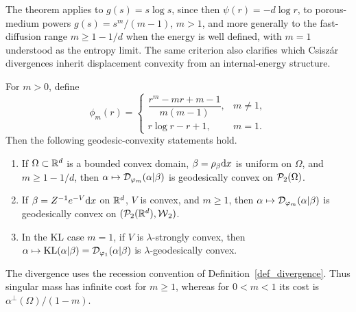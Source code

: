 The theorem applies to \(g(s)=s\log s\), since then \(\psi(r)=-d\log r\), to porous-medium powers \(g(s)=s^m/(m-1)\), \(m>1\), and more generally to the fast-diffusion range \(m\geq1-1/d\) when the energy is well defined, with \(m=1\) understood as the entropy limit.
The same criterion also clarifies which Csisz\'ar divergences inherit displacement convexity from an internal-energy structure.
\begin{prop}\label{prop-power-divergences-geodesic-convexity}\label{prop-kl-gibbs-geodesic-convexity}
	For \(m>0\), define
	\[
		\phi_m(r)=
		\begin{cases}
			\dfrac{r^m-mr+m-1}{m(m-1)}, & m\neq1,\\[2mm]
			r\log r-r+1, & m=1.
		\end{cases}
	\]
	Then the following geodesic-convexity statements hold.
	\begin{enumerate}
	\item If \(\Omega\subset\mathbb{R}^d\) is a bounded convex domain, \(\beta=\rho_{\beta}\mathrm{d} x\) is uniform on \(\Omega\), and \(m\geq1-1/d\), then \(\alpha\mapsto\mathcal{D}_{\varphi_m}(\alpha|\beta)\) is geodesically convex on \(\mathcal{P}_2(\Omega)\).
		\item If \(\beta=Z^{-1}e^{-V}\mathrm{d} x\) on \(\mathbb{R}^d\), \(V\) is convex, and \(m\geq1\), then \(\alpha\mapsto\mathcal{D}_{\varphi_m}(\alpha|\beta)\) is geodesically convex on \((\mathcal{P}_2(\mathbb{R}^d),\operatorname{\mathcal{W}}_2)\).
		\item In the KL case \(m=1\), if \(V\) is \(\lambda\)-strongly convex, then \(\alpha\mapsto\operatorname{KL}(\alpha|\beta)=\mathcal{D}_{\varphi_1}(\alpha|\beta)\) is \(\lambda\)-geodesically convex.
	\end{enumerate}
	The divergence uses the recession convention of Definition~\ref{def_divergence}. Thus singular mass has infinite cost for \(m\geq1\), whereas for \(0<m<1\) its cost is \(\alpha^\perp(\Omega)/(1-m)\).
\end{prop}

